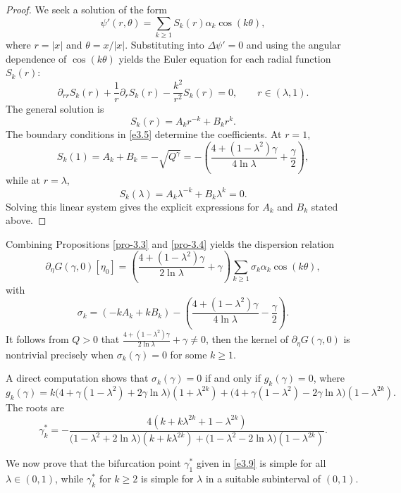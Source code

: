 \documentclass[reqno]{amsart}
\numberwithin{equation}{section}
\numberwithin{equation}{section}
\numberwithin{equation}{section}
\begin{document}
\begin{proof}
We seek a solution of the form
\[
\psi'(r,\theta) = \sum_{k \geq 1} S_k(r) \alpha_k \cos(k\theta),
\]
where \(r = |x|\) and \(\theta = x/|x|\). Substituting into \(\Delta \psi' = 0\) and using the angular dependence of \(\cos(k\theta)\) yields the Euler equation for each radial function \(S_k(r)\):
$$
\partial_{rr}S_k(r) + \frac{1}{r} \partial_rS_k(r) - \frac{k^2}{r^2} S_k(r) = 0, \qquad r \in (\lambda, 1).
$$
The general solution is
\[
S_k(r) = A_k r^{-k} + B_k r^k.
\]
The boundary conditions in \eqref{e3.5} determine the coefficients. At \(r=1\),
\[
S_k(1) = A_k + B_k = -\sqrt{Q^\gamma} = -\left( \frac{4 + (1 - \lambda^2)\gamma}{4\ln\lambda} + \frac{\gamma}{2} \right),
\]
while at \(r=\lambda\),
\[
S_k(\lambda) = A_k \lambda^{-k} + B_k \lambda^k = 0.
\]
Solving this linear system gives the explicit expressions for \(A_k\) and \(B_k\) stated above.
\end{proof}

Combining Propositions \ref{pro-3.3} and \ref{pro-3.4} yields the dispersion relation
\begin{equation}\label{e3.7}
\partial_\eta G(\gamma, 0)[\eta_0] = \left( \frac{4 + (1 - \lambda^2)\gamma}{2\ln\lambda} + \gamma \right) \sum_{k \geq 1} \sigma_k \alpha_k \cos(k\theta),
\end{equation}
with
\begin{equation}\label{e3.8}
\sigma_k = (-k A_k + k B_k) - \left( \frac{4 + (1 - \lambda^2)\gamma}{4\ln\lambda} - \frac{\gamma}{2} \right).
\end{equation}
It follows from $Q>0$ that $\frac{4+(1-\lambda^2)\gamma}{2\ln\lambda}+\gamma\neq0$, then the kernel of \(\partial_\eta G(\gamma, 0)\) is nontrivial precisely when \(\sigma_k(\gamma) = 0\) for some \(k \geq 1\).

A direct computation shows that \(\sigma_k(\gamma) = 0\) if and only if \(g_k(\gamma) = 0\), where
\[
g_k(\gamma) = k \bigl(4 + \gamma(1 - \lambda^2) + 2\gamma \ln\lambda\bigr)(1 + \lambda^{2k}) + \bigl(4 + \gamma(1 - \lambda^2) - 2\gamma \ln\lambda\bigr)(1 - \lambda^{2k}).
\]
The roots are
\begin{equation}\label{e3.9}
\gamma_k^* = -\frac{4(k + k\lambda^{2k} + 1 - \lambda^{2k})}{\bigl(1 - \lambda^2 + 2\ln\lambda\bigr)(k + k\lambda^{2k}) + \bigl(1 - \lambda^2 - 2\ln\lambda\bigr)(1 - \lambda^{2k})}.
\end{equation}

We now prove that the bifurcation point \(\gamma_1^*\) given in \eqref{e3.9} is simple for all \(\lambda \in (0,1)\), while \(\gamma_k^*\) for \(k \geq 2\) is simple for \(\lambda\) in a suitable subinterval of \((0,1)\).
\end{document}
